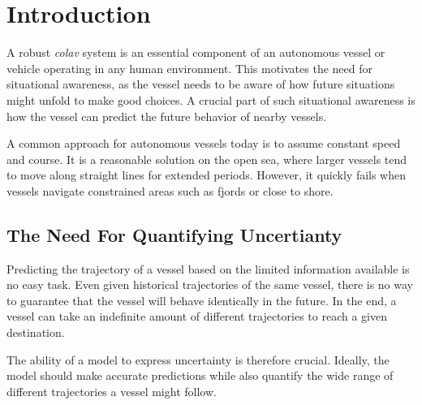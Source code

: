 \chapter{Introduction}
A robust \textit{\acrfull{colav}} system is an essential component of an autonomous vessel or vehicle operating in any human environment. This motivates the need for situational awareness, as the vessel needs to be aware of how future situations might unfold to make good choices. A crucial part of such situational awareness is how the vessel can predict the future behavior of nearby vessels. 

A common approach for autonomous vessels today is to assume constant speed and course. It is a reasonable solution on the open sea, where larger vessels tend to move along straight lines for extended periods. However, it quickly fails when vessels navigate constrained areas such as fjords or close to shore.    


\section{The Need For Quantifying Uncertianty}
Predicting the trajectory of a vessel based on the limited information available is no easy task. Even given historical trajectories of the same vessel, there is no way to guarantee that the vessel will behave identically in the future. In the end, a vessel can take an indefinite amount of different trajectories to reach a given destination. 

The ability of a model to express uncertainty is therefore crucial. Ideally, the model should make accurate predictions while also quantify the wide range of different trajectories a vessel might follow. 

